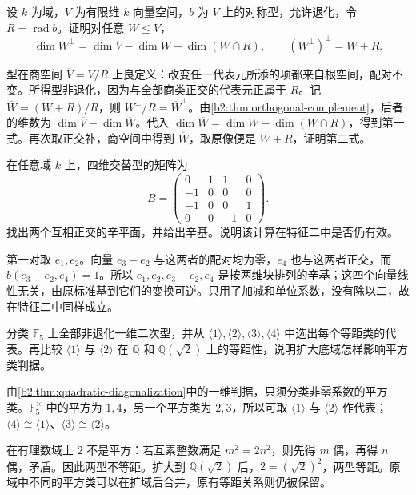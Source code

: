 \begin{exercise}\label{b2:ex:10-degenerate-orthogonals}
	设 \(k\) 为域，\(V\) 为有限维 \(k\) 向量空间，\(b\) 为 \(V\) 上的对称型，允许退化，令 \(R=\operatorname{rad}b\)。证明对任意 \(W\le V\)，
	\[
		\dim W^\perp=\dim V-\dim W+\dim(W\cap R), \qquad (W^\perp)^\perp=W+R.
	\]
\end{exercise}
\begin{solution}
	型在商空间 \(\overline V=V/R\) 上良定义：改变任一代表元所添的项都来自根空间，配对不变。所得型非退化，因为与全部商类正交的代表元正属于 \(R\)。记 \(\overline W=(W+R)/R\)，则 \(W^\perp/R=\overline W^\perp\)。由\cref{b2:thm:orthogonal-complement}，后者的维数为 \(\dim\overline V-\dim\overline W\)。代入 \(\dim\overline W=\dim W-\dim(W\cap R)\)，得到第一式。再次取正交补，商空间中得到 \(\overline W\)，取原像便是 \(W+R\)，证明第二式。
\end{solution}

\begin{exercise}\label{b2:ex:10-symplectic-basis}
	在任意域 \(k\) 上，四维交替型的矩阵为
	\[
		B=\begin{pmatrix}0&1&1&0\\-1&0&0&0\\-1&0&0&1\\0&0&-1&0\end{pmatrix}.
	\]
	找出两个互相正交的辛平面，并给出辛基。说明该计算在特征二中是否仍有效。
\end{exercise}
\begin{solution}
	第一对取 \(e_1,e_2\)。向量 \(e_3-e_2\) 与这两者的配对均为零，\(e_4\) 也与这两者正交，而 \(b(e_3-e_2,e_4)=1\)。所以 \(e_1,e_2,e_3-e_2,e_4\) 是按两维块排列的辛基；这四个向量线性无关，由原标准基到它们的变换可逆。只用了加减和单位系数，没有除以二，故在特征二中同样成立。
\end{solution}

\begin{exercise}\label{b2:ex:10-one-dimensional-square-class}
	分类 \(\mathbb F_5\) 上全部非退化一维二次型，并从 \(\langle1\rangle,\langle2\rangle,\langle3\rangle,\langle4\rangle\) 中选出每个等距类的代表。再比较 \(\langle1\rangle\) 与 \(\langle2\rangle\) 在 \(\mathbb Q\) 和 \(\mathbb Q(\sqrt2)\) 上的等距性，说明扩大底域怎样影响平方类判据。
\end{exercise}
\begin{solution}
	由\cref{b2:thm:quadratic-diagonalization}中的一维判据，只须分类非零系数的平方类。\(\mathbb F_5^\times\) 中的平方为 \(1,4\)，另一个平方类为 \(2,3\)，所以可取 \(\langle1\rangle\) 与 \(\langle2\rangle\) 作代表；\(\langle4\rangle\cong\langle1\rangle\)、\(\langle3\rangle\cong\langle2\rangle\)。

	在有理数域上 \(2\) 不是平方：若互素整数满足 \(m^2=2n^2\)，则先得 \(m\) 偶，再得 \(n\) 偶，矛盾。因此两型不等距。扩大到 \(\mathbb Q(\sqrt2)\) 后，\(2=(\sqrt2)^2\)，两型等距。原域中不同的平方类可以在扩域后合并，原有等距关系则仍被保留。
\end{solution}

